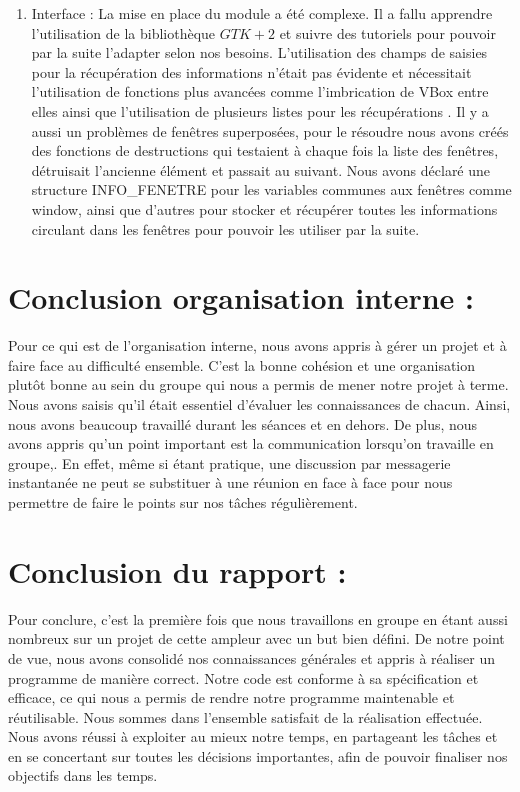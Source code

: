 \documentclass{article}
\begin{document}
\begin{enumerate}
			\item Interface :
			 La mise en place du module a été complexe. Il a fallu apprendre l'utilisation de la bibliothèque $GTK+2$ et suivre des tutoriels pour pouvoir par la suite l'adapter selon nos besoins.  L'utilisation des champs de saisies  pour la récupération des informations n'était pas évidente et nécessitait l'utilisation de fonctions plus avancées comme l'imbrication de VBox entre elles ainsi que l'utilisation de plusieurs listes pour les récupérations . 
Il y a aussi un problèmes de fenêtres superposées,  pour le résoudre nous avons créés des fonctions de destructions qui testaient à chaque fois la liste des fenêtres, détruisait l'ancienne élément et passait au suivant.
Nous avons déclaré une structure INFO_FENETRE pour les variables communes aux fenêtres comme window, ainsi que d'autres pour stocker et récupérer toutes les informations circulant dans les fenêtres pour pouvoir les utiliser par la suite.      
	\end{enumerate}

\section{Conclusion organisation interne :}
Pour ce qui est de l'organisation interne, nous avons appris à gérer un projet et à faire face au difficulté ensemble. C'est la bonne cohésion et une organisation plutôt bonne au sein du groupe  qui nous a permis de mener notre projet à terme. 
Nous avons saisis qu'il était essentiel d'évaluer les connaissances de chacun. Ainsi, nous avons beaucoup travaillé durant les séances et en dehors.  De plus, nous avons appris qu'un point important est la communication lorsqu'on travaille en groupe,. En effet, même si étant pratique, une discussion par messagerie instantanée ne peut se substituer à une réunion en face à face pour nous permettre de faire le points sur nos tâches régulièrement. 

\section{Conclusion du rapport :}
Pour conclure, c'est la première fois que nous travaillons en groupe en étant aussi nombreux sur un projet de cette ampleur avec un but bien défini. De notre point de vue, nous avons consolidé nos connaissances générales et appris à réaliser un programme de manière correct. 
Notre code est conforme à sa spécification et efficace, ce qui nous a permis de rendre notre programme maintenable et réutilisable. 
Nous sommes dans l'ensemble satisfait de la réalisation effectuée. Nous avons réussi à exploiter au mieux notre temps, en partageant les tâches et en se concertant sur toutes les décisions importantes, afin de pouvoir finaliser nos objectifs dans les temps.
\end{document}
